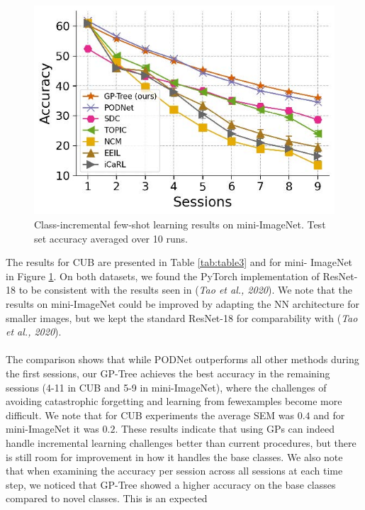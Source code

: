 \documentclass[preprint,11pt]{elsarticle}
\begin{document}
        \begin{figure}
        
            \centering
            \includegraphics[width=0.5\linewidth]{images/achituve21d.jpg}
            \caption{Class-incremental few-shot learning results on mini-ImageNet. Test set accuracy averaged over 10 runs.}
            \label{fig:fig3}
        
        \end{figure}
        The results for CUB are presented in Table \ref{tab:table3} and for mini-
        ImageNet in Figure \ref{fig:fig3}. On both datasets, we found the
        PyTorch implementation of ResNet-18 to be consistent with
        the results seen in (\textit{Tao et al., 2020}\cite{tao2020few}). We note that the results
        on mini-ImageNet could be improved by adapting the NN
        architecture for smaller images, but we kept the standard
        ResNet-18 for comparability with (\textit{Tao et al., 2020}\cite{tao2020few}).
        \\
        \\
        The comparison shows that while PODNet outperforms
        all other methods during the first sessions, our GP-Tree
        achieves the best accuracy in the remaining sessions (4-11
        in CUB and 5-9 in mini-ImageNet), where the challenges
        of avoiding catastrophic forgetting and learning from fewexamples
        become more difficult. We note that for CUB experiments
        the average SEM was $0.4$ and for mini-ImageNet
        it was $0.2$. These results indicate that using GPs can indeed
        handle incremental learning challenges better than current
        procedures, but there is still room for improvement in how it
        handles the base classes. We also note that when examining the accuracy per session across all sessions at each time step,
        we noticed that GP-Tree showed a higher accuracy on the
        base classes compared to novel classes. This is an expected
\end{document}
